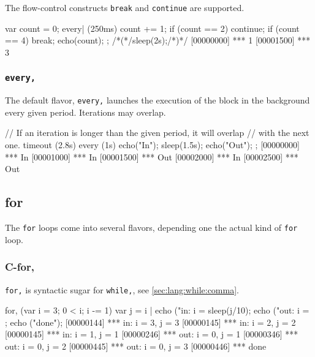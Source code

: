 The flow-control constructs \lstinline|break| and \lstinline|continue|
are supported.

\begin{urbiscript}
{
  var count = 0;
  every| (250ms)
  {
    count += 1;
    if (count == 2)
      continue;
    if (count == 4)
      break;
    echo(count);
  }
};
/*(*/sleep(2s);/*)*/
[00000000] *** 1
[00001500] *** 3
\end{urbiscript}


\subsubsection{\lstinline'every,'}
The default flavor, \lstinline|every,| launches the execution of the
block in the background every given period. Iterations may overlap.

\begin{urbiscript}[firstnumber=1]
// If an iteration is longer than the given period, it will overlap
// with the next one.
timeout (2.8s)
  every (1s)
  {
    echo("In");
    sleep(1.5s);
    echo("Out");
  };
[00000000] *** In
[00001000] *** In
[00001500] *** Out
[00002000] *** In
[00002500] *** Out
\end{urbiscript}

\subsection{for}

The \lstinline|for| loops come into several flavors, depending one the
actual kind of \lstinline|for| loop.

\subsubsection{C-for,}
\experimentalremoved{}

\lstinline|for,| is syntactic sugar for \lstinline|while,|, see
\autoref{sec:lang:while:comma}.

\begin{urbiscript}
for, (var i = 3; 0 < i; i -= 1)
{
  var j = i |
  echo ("in: i = %
  sleep(j/10);
  echo ("out: i = %
};
echo ("done");
[00000144] *** in: i = 3, j = 3
[00000145] *** in: i = 2, j = 2
[00000145] *** in: i = 1, j = 1
[00000246] *** out: i = 0, j = 1
[00000346] *** out: i = 0, j = 2
[00000445] *** out: i = 0, j = 3
[00000446] *** done
\end{urbiscript}

